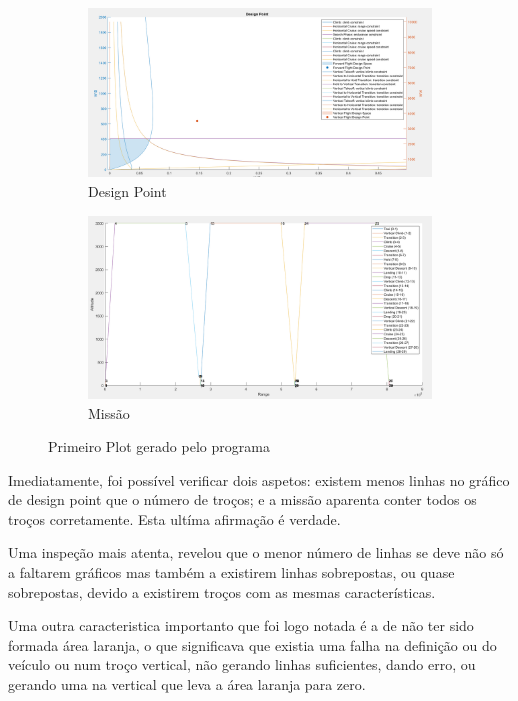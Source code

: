 \begin{figure}[h]
    \centering
    \begin{subfigure}[h]{0.70\textwidth}
        \includegraphics[width=\textwidth]{Imagens/firstplot_designpoint.PNG}
        \caption{Design Point}
        \label{}
    \end{subfigure}
    \hfill
    \begin{subfigure}[h]{0.70\textwidth}
        \includegraphics[width=\textwidth]{Imagens/firstplot_mission.PNG}
        \caption{Missão}
        \label{}
    \end{subfigure}
    \caption{Primeiro Plot gerado pelo programa}
    \label{firstplot}
\end{figure}
\FloatBarrier
Imediatamente, foi possível verificar dois aspetos: existem menos linhas no gráfico de design point que o número de troços; e a missão aparenta conter todos os troços corretamente. Esta ultíma afirmação é verdade.\par
Uma inspeção mais atenta, revelou que o menor número de linhas se deve não só a faltarem gráficos mas também a existirem linhas sobrepostas, ou quase sobrepostas, devido a existirem troços com as mesmas características.\par
Uma outra caracteristica importanto que foi logo notada é a de não ter sido formada área laranja, o que significava que existia uma falha na definição ou do veículo ou num troço vertical, não gerando linhas suficientes, dando erro, ou gerando uma na vertical que leva  a área laranja para zero.\par

